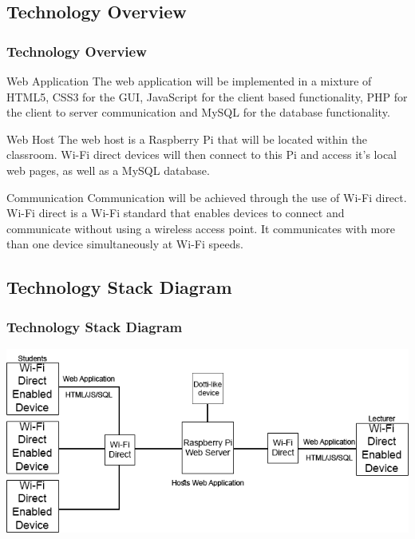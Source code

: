 \documentclass{beamer}
\begin{document}
\subsection{Technology Overview}
\begin{frame}
\frametitle{Technology Overview}
\begin{block}{Web Application}
The web application will be implemented in a mixture of HTML5, CSS3 for the GUI, JavaScript for the client based functionality, PHP for the client to server communication and MySQL for the database functionality.
\end{block}

\begin{block}{Web Host}
The web host is a Raspberry Pi that will be located within the classroom. Wi-Fi direct devices will then connect to this Pi and access it's local web pages, as well as a MySQL database.
\end{block}

\begin{block}{Communication}
Communication will be achieved through the use of Wi-Fi direct. Wi-Fi direct is a Wi-Fi standard that enables devices to connect and communicate without using a wireless access point. It communicates with more than one device simultaneously at Wi-Fi speeds.
\end{block}
\end{frame}

\subsection{Technology Stack Diagram}
\begin{frame}
\frametitle{Technology Stack Diagram}
\begin{centering}
    \includegraphics[width=1\textwidth]{stackdiagram.png}
\end{centering}
\end{frame}
\end{document}
